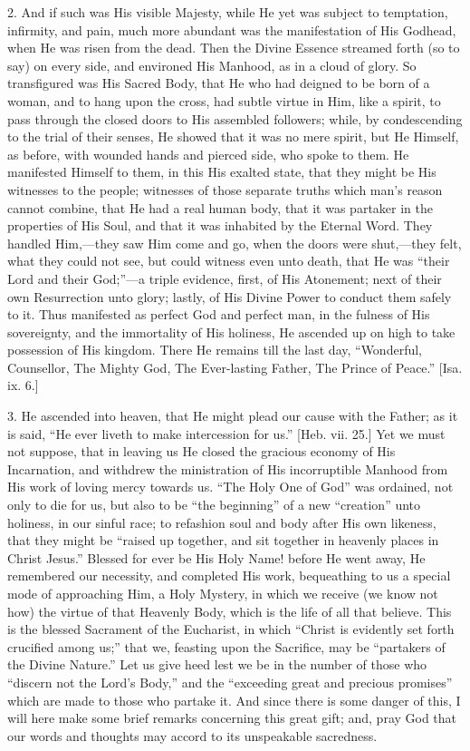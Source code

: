 2. And if such was His visible Majesty, while He yet was subject to
temptation, infirmity, and pain, much more abundant was the
manifestation of His Godhead, when He was risen from the dead. Then the
Divine Essence streamed forth (so to say) on every side, and environed
His Manhood, as in a cloud of glory. So transfigured was His Sacred
Body, that He who had deigned to be born of a woman, and to hang upon
the cross, had subtle virtue in Him, like a spirit, to pass through the
closed doors to His assembled followers; while, by condescending to the
trial of their senses, He showed that it was no mere spirit, but He
Himself, as before, with wounded hands and pierced side, who spoke to
them. He manifested Himself to them, in this His exalted state, that
they might be His witnesses to the people; witnesses of those separate
truths which man's reason cannot combine, that He had a real human body,
that it was partaker in the properties of His Soul, and that it was
inhabited by the Eternal Word. They handled Him,—they saw Him come and
go, when the doors were shut,—they felt, what they could not see, but
could witness even unto death, that He was ``their Lord and their
God;''—a triple evidence, first, of His Atonement; next of their
own Resurrection unto glory; lastly, of His Divine Power to conduct them
safely to it. Thus manifested as perfect God and perfect man, in the
fulness of His sovereignty, and the immortality of His holiness, He
ascended up on high to take possession of His kingdom. There He remains
till the last day, ``Wonderful, Counsellor, The Mighty God, The
Ever-lasting Father, The Prince of Peace.'' [Isa. ix. 6.]

3. He ascended into heaven, that He might plead our cause with the
Father; as it is said, ``He ever liveth to make intercession for
us.'' [Heb. vii. 25.] Yet we must not suppose, that in leaving us He
closed the gracious economy of His Incarnation, and withdrew the
ministration of His incorruptible Manhood from His work of loving mercy
towards us. ``The Holy One of God'' was ordained, not only to
die for us, but also to be ``the beginning'' of a new
``creation'' unto holiness, in our sinful race; to refashion
soul and body after His own likeness, that they might be ``raised up
together, and sit together in heavenly places in Christ Jesus.''
Blessed for ever be His Holy Name! before He went away, He remembered
our necessity, and completed His work, bequeathing to us a special mode
of approaching Him, a Holy Mystery, in which we receive (we know not
how) the virtue of that Heavenly Body, which is the life of all that
believe. This is the blessed Sacrament of the Eucharist, in which
``Christ is evidently set forth crucified among us;'' that we,
feasting upon the Sacrifice, may be ``partakers of the Divine
Nature.'' Let us give heed lest we be in the number of those who
``discern not the Lord's Body,'' and the ``exceeding great and
precious promises'' which are made to those who partake it. And
since there is some danger of this, I will here make some brief remarks
concerning this great gift; and, pray God that our words and thoughts
may accord to its unspeakable sacredness.

